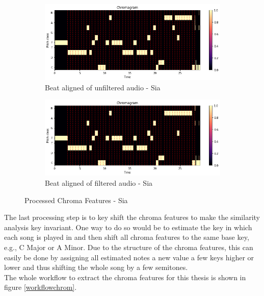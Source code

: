 \begin{figure}[htbp]
{{			\begin{subfigure}{.495\textwidth}
				\centering    
				\includegraphics[scale=0.3]{Images/Chroma/siaunfiltered.png}
				\caption{Beat aligned of unfiltered audio - Sia}
				\label{siaub}
			\end{subfigure}
			\begin{subfigure}{.495\textwidth}
				\centering     
				\includegraphics[scale=0.3]{Images/Chroma/siafiltered.png}
				\caption{Beat aligned of filtered audio - Sia}
				\label{siafb}
			\end{subfigure}%
	}}
	\caption{Processed Chroma Features - Sia}
	\label{beataligned}
\end{figure}
The last processing step is to key shift the chroma features to make the similarity analysis key invariant. One way to do so would be to estimate the key in which each song is played in and then shift all chroma features to the same base key, e.g., C Major or A Minor. Due to the structure of the chroma features, this can easily be done by assigning all estimated notes a new value a few keys higher or lower and thus shifting the whole song by a few semitones.\\
The whole workflow to extract the chroma features for this thesis is shown in figure \ref{workflowchrom}.\\
\begin{figure}[htbp]
	\centering
\end{figure}
